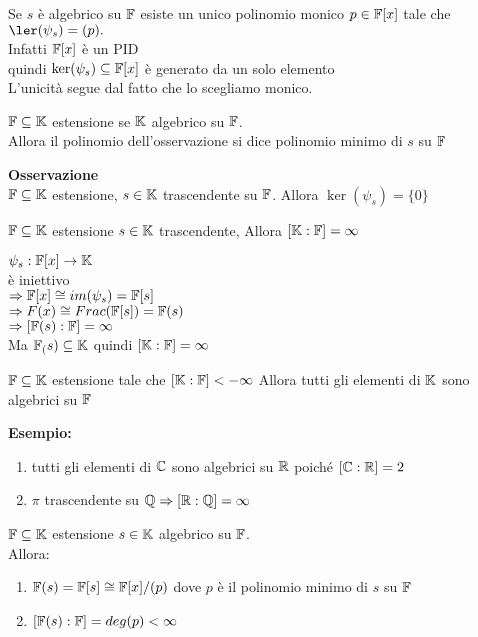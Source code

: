 \documentclass[12px]{article}
\begin{document}
	 Se $s$ è algebrico su $\mathbb{F}$ esiste un unico polinomio monico $p\in\mathbb{F}[x]$ tale che  $\ler(\psi_s) = (p).$\\
	 Infatti  $\mathbb{F}[x]$ è un PID\\
	 quindi $\ker(\psi_s)\subseteq\mathbb{F}[x]$ è generato da un solo elemento\\
	 L'unicità segue dal fatto che lo scegliamo monico.\\
	  \begin{defi}
	 	$\mathbb{F}\subseteq \mathbb{K}$ estensione se $\mathbb{K}$ algebrico su $\mathbb{F}$.\\
		Allora il polinomio dell'osservazione si dice polinomio minimo di $s$ su $\mathbb{F}$
	 \end{defi}
	 \textbf{Osservazione}\\
	 $\mathbb{F}\subseteq \mathbb{K}$ estensione,  $s\in\mathbb{K}$ trascendente su $\mathbb{F}$. Allora $\ker(\psi_s)= \{0\}$
	  \begin{prop}
		  $\mathbb{F}\subseteq\mathbb{K}$ estensione $s\in\mathbb{K}$ trascendente, Allora $[\mathbb{K}:\mathbb{F}] = \infty$
	 \end{prop}
	 \begin{dimo}
		 $\psi_s: \mathbb{F}[x] \rightarrow\mathbb{K}$\\
		 è iniettivo \\
		 $ \Rightarrow \mathbb{F}[x]\cong im(\psi_s) = \mathbb{F}[s]$ \\
		 $ \Rightarrow  F(x)\cong Frac(\mathbb{F}[s]) = \mathbb{F}(s)$ \\
		 $ \Rightarrow [\mathbb{F}(s): \mathbb{F}] = \infty$\\
		 Ma $\mathbb{F}_(s)\subseteq \mathbb{K}$ quindi $[\mathbb{K}:\mathbb{F}] = \infty$
	 \end{dimo}
	 \begin{coro}
		 $\mathbb{F}\subseteq \mathbb{K}$ estensione tale che  $[\mathbb{K}:\mathbb{F}] < -\infty$ Allora tutti gli elementi di  $\mathbb{K}$ sono algebrici su $\mathbb{F}$
	 \end{coro}
	 \textbf{Esempio:}\\
	 \begin{enumerate}
		 \item tutti gli elementi di $\mathbb{C}$ sono algebrici su $ \mathbb{R}$ poiché $[\mathbb{C}:\mathbb{R}] = 2$\\
		 \item  $\pi$ trascendente su $\mathbb{Q} \Rightarrow [\mathbb{R}:\mathbb{Q}] = \infty$
	 \end{enumerate}
	 \begin{prop}
	 	$\mathbb{F}\subseteq \mathbb{K}$ estensione $s\in\mathbb{K}$ algebrico su $\mathbb{F}$.\\
		Allora:
		\begin{enumerate}
			\item $\mathbb{F}(s) = \mathbb{F}[s]\cong \mathbb{F}[x]/(p)$ dove $p$ è il polinomio minimo di $s$ su $\mathbb{F}$
			\item  $[\mathbb{F}(s):\mathbb{F}] = deg(p) < \infty$
		\end{enumerate}
	 \end{prop}
\end{document}

